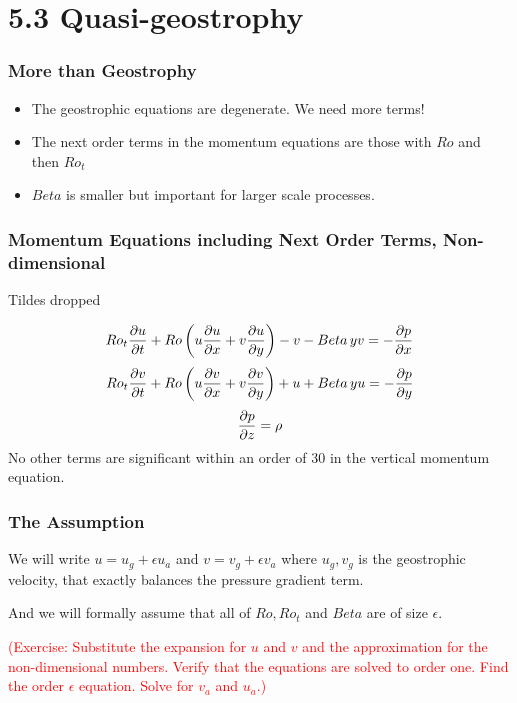 \documentclass[xcolor=dvipsnames]{beamer}
\begin{document}
\section{5.3 Quasi-geostrophy}

\begin{frame}
\frametitle{More than Geostrophy}

\begin{itemize}
\item The geostrophic equations are degenerate.  We need more terms!

\item The next order terms in the momentum equations are those with $Ro$ and then $Ro_t$ 

\item $Beta$ is smaller but important for larger scale processes.
\end{itemize}

\end{frame}

\begin{frame}
\frametitle{Momentum Equations including Next Order Terms, Non-dimensional}

Tildes dropped

\[
Ro_t \frac {\partial u}{\partial t} + Ro \left( u\frac {\partial u}{\partial x} + v\frac {\partial u}{\partial y} \right) - v - Beta\, y v = -\frac {\partial p}{\partial x} 
\]
\[
Ro_t \frac {\partial v}{\partial t} + Ro \left( u\frac {\partial v}{\partial x} + v\frac {\partial v}{\partial y} \right) + u + Beta\, y u = -\frac {\partial p}{\partial y} 
\]
\[
\frac {\partial p}{\partial z} = \rho
\]
No other terms are significant within an order of 30 in the vertical momentum equation.

\end{frame}
\begin{frame}
\frametitle{The Assumption}

We will write $u = u_g + \epsilon u_a$ and $v = v_g + \epsilon v_a$ where $u_g,v_g$ is the geostrophic velocity, that exactly balances the pressure gradient term.

And we will formally assume that all of $Ro, Ro_t$ and $Beta$ are of size $\epsilon$.  

\vspace{0.2in}

\textcolor{red}{(Exercise: Substitute the expansion for $u$ and $v$ and the approximation for the non-dimensional numbers.  Verify that the equations are solved to order one.  Find the order $\epsilon$ equation.  Solve for $v_a$ and $u_a$.)}
\end{frame}
\end{document}
